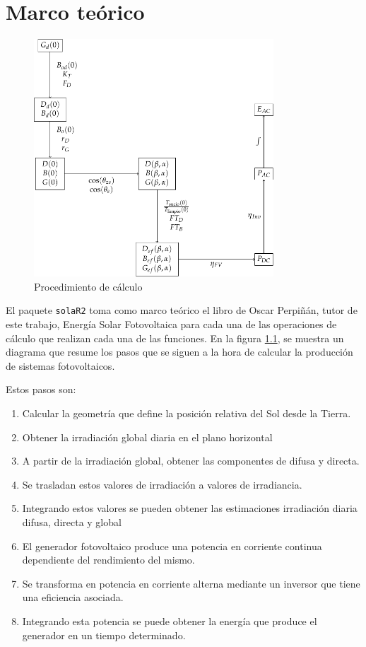 \chapter{Marco teórico}
\label{chap:marco-teorico}
\begin{figure}[H]
\centering
\includegraphics[keepaspectratio,width=0.8\textwidth,height=0.44\textheight]{figuras/ProcedimientoCalculoRadiacionInclinada.pdf}
\caption{\label{fig:org12b406b}Procedimiento de cálculo}
\end{figure}
El paquete \texttt{solaR2} toma como marco teórico el libro de Oscar Perpiñán, tutor de este trabajo, Energía Solar Fotovoltaica \cite{Perpinan2023} para cada una de las operaciones de cálculo que realizan cada una de las funciones.
En la figura \ref{fig:org12b406b}, se muestra un diagrama que resume los pasos que se siguen a la hora de calcular la producción de sistemas fotovoltaicos.


Estos pasos son:
\begin{enumerate}
\item Calcular la geometría que define la posición relativa del Sol desde la Tierra.
\item Obtener la irradiación global diaria en el plano horizontal
\item A partir de la irradiación global, obtener las componentes de difusa y directa.
\item Se trasladan estos valores de irradiación a valores de irradiancia.
\item Integrando estos valores se pueden obtener las estimaciones irradiación diaria difusa, directa y global
\item El generador fotovoltaico produce una potencia en corriente continua dependiente del rendimiento del mismo.
\item Se transforma en potencia en corriente alterna mediante un inversor que tiene una eficiencia asociada.
\item Integrando esta potencia se puede obtener la energía que produce el generador en un tiempo determinado.
\end{enumerate}


